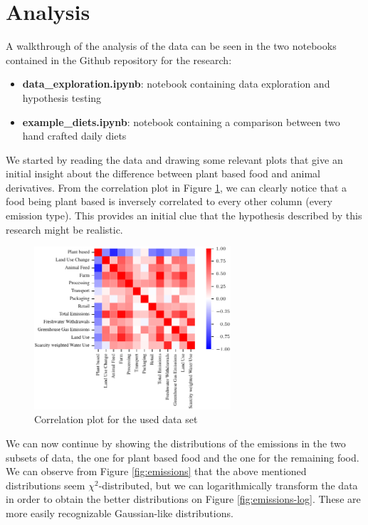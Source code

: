 \documentclass{article}
\begin{document}
\section{Analysis}
\label{analysis}

A walkthrough of the analysis of the data can be seen in the two notebooks contained in the Github repository for the research:

\begin{itemize}
    \item \textbf{data\_exploration.ipynb}: notebook containing data exploration and hypothesis testing
    \item \textbf{example\_diets.ipynb}: notebook containing a comparison between two hand crafted daily diets
\end{itemize}

We started by reading the data and drawing some relevant plots that give an initial insight about the difference between plant based food and animal derivatives. From the correlation plot in Figure \ref{fig:corr}, we can clearly notice that a food being plant based is inversely correlated to every other column (every emission type). This provides an initial clue that the hypothesis described by this research might be realistic. 

\begin{figure}[h]
  \centering
  \includegraphics[width=0.65\textwidth]{figures/heat-map.pdf}
  \caption{Correlation plot for the used data set}
  \label{fig:corr}
\end{figure}

We can now continue by showing the distributions of the emissions in the two subsets of data, the one for plant based food and the one for the remaining food. We can observe from Figure \ref{fig:emissions} that the above mentioned distributions seem $\chi^2$-distributed, but we can logarithmically transform the data in order to obtain the better distributions on Figure \ref{fig:emissions-log}. These are more easily recognizable Gaussian-like distributions.
\end{document}
